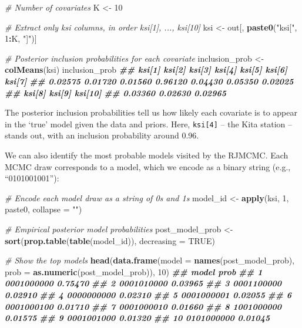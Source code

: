 \documentclass[
  12pt,
]{krantz}
\newenvironment{Shaded}{\begin{snugshade}}{\end{snugshade}}
\newcommand{\AttributeTok}[1]{\textcolor[rgb]{0.13,0.29,0.53}{#1}}
\newcommand{\CommentTok}[1]{\textcolor[rgb]{0.56,0.35,0.01}{\textit{#1}}}
\newcommand{\ConstantTok}[1]{\textcolor[rgb]{0.56,0.35,0.01}{#1}}
\newcommand{\DecValTok}[1]{\textcolor[rgb]{0.00,0.00,0.81}{#1}}
\newcommand{\DocumentationTok}[1]{\textcolor[rgb]{0.56,0.35,0.01}{\textbf{\textit{#1}}}}
\newcommand{\FunctionTok}[1]{\textcolor[rgb]{0.13,0.29,0.53}{\textbf{#1}}}
\newcommand{\NormalTok}[1]{#1}
\newcommand{\OtherTok}[1]{\textcolor[rgb]{0.56,0.35,0.01}{#1}}
\newcommand{\SpecialCharTok}[1]{\textcolor[rgb]{0.81,0.36,0.00}{\textbf{#1}}}
\newcommand{\StringTok}[1]{\textcolor[rgb]{0.31,0.60,0.02}{#1}}
\begin{document}
\begin{Shaded}
\begin{Highlighting}[]
\CommentTok{\# Number of covariates}
\NormalTok{K }\OtherTok{\textless{}{-}} \DecValTok{10}

\CommentTok{\# Extract only ksi columns, in order ksi[1], ..., ksi[10]}
\NormalTok{ksi }\OtherTok{\textless{}{-}}\NormalTok{ out[, }\FunctionTok{paste0}\NormalTok{(}\StringTok{"ksi["}\NormalTok{, }\DecValTok{1}\SpecialCharTok{:}\NormalTok{K, }\StringTok{"]"}\NormalTok{)]}

\CommentTok{\# Posterior inclusion probabilities for each covariate}
\NormalTok{inclusion\_prob }\OtherTok{\textless{}{-}} \FunctionTok{colMeans}\NormalTok{(ksi)}
\NormalTok{inclusion\_prob}
\DocumentationTok{\#\#  ksi[1]  ksi[2]  ksi[3]  ksi[4]  ksi[5]  ksi[6]  ksi[7] }
\DocumentationTok{\#\# 0.02575 0.01720 0.01560 0.96120 0.04430 0.05350 0.02025 }
\DocumentationTok{\#\#  ksi[8]  ksi[9] ksi[10] }
\DocumentationTok{\#\# 0.03360 0.02630 0.02965}
\end{Highlighting}
\end{Shaded}

The posterior inclusion probabilities tell us how likely each covariate is to appear in the `true' model given the data and priors. Here, \texttt{ksi{[}4{]}} -- the Kita station -- stands out, with an inclusion probability around 0.96.

We can also identify the most probable models visited by the RJMCMC. Each MCMC draw corresponds to a model, which we encode as a binary string (e.g., ``0101001001''):

\begin{Shaded}
\begin{Highlighting}[]
\CommentTok{\# Encode each model draw as a string of 0s and 1s}
\NormalTok{model\_id }\OtherTok{\textless{}{-}} \FunctionTok{apply}\NormalTok{(ksi, }\DecValTok{1}\NormalTok{, paste0, }\AttributeTok{collapse =} \StringTok{""}\NormalTok{)}

\CommentTok{\# Empirical posterior model probabilities}
\NormalTok{post\_model\_prob }\OtherTok{\textless{}{-}} \FunctionTok{sort}\NormalTok{(}\FunctionTok{prop.table}\NormalTok{(}\FunctionTok{table}\NormalTok{(model\_id)), }\AttributeTok{decreasing =} \ConstantTok{TRUE}\NormalTok{)}

\CommentTok{\# Show the top models}
\FunctionTok{head}\NormalTok{(}\FunctionTok{data.frame}\NormalTok{(}\AttributeTok{model =} \FunctionTok{names}\NormalTok{(post\_model\_prob), }
                \AttributeTok{prob =} \FunctionTok{as.numeric}\NormalTok{(post\_model\_prob)), }\DecValTok{10}\NormalTok{)}
\DocumentationTok{\#\#         model    prob}
\DocumentationTok{\#\# 1  0001000000 0.75470}
\DocumentationTok{\#\# 2  0001010000 0.03965}
\DocumentationTok{\#\# 3  0001100000 0.02910}
\DocumentationTok{\#\# 4  0000000000 0.02310}
\DocumentationTok{\#\# 5  0001000001 0.02055}
\DocumentationTok{\#\# 6  0001000100 0.01710}
\DocumentationTok{\#\# 7  0001000010 0.01660}
\DocumentationTok{\#\# 8  1001000000 0.01575}
\DocumentationTok{\#\# 9  0001001000 0.01320}
\DocumentationTok{\#\# 10 0101000000 0.01045}
\end{Highlighting}
\end{Shaded}
\end{document}
